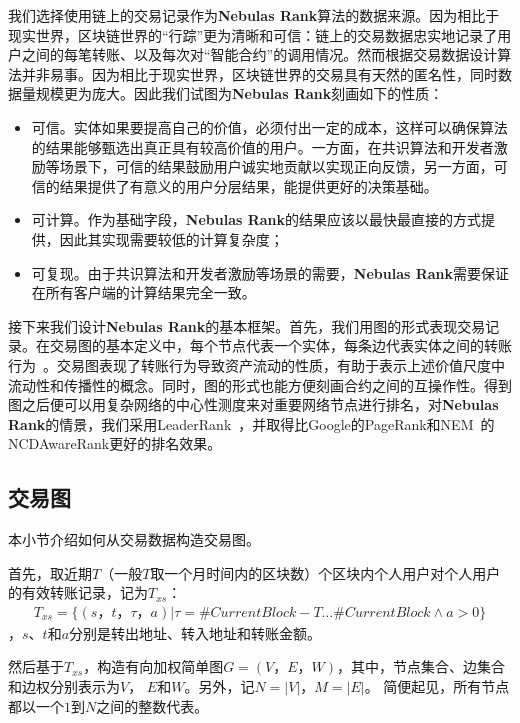 我们选择使用链上的交易记录作为\textbf{Nebulas Rank}算法的数据来源。因为相比于现实世界，区块链世界的“行踪”更为清晰和可信：链上的交易数据忠实地记录了用户之间的每笔转账、以及每次对“智能合约”的调用情况。然而根据交易数据设计算法并非易事。因为相比于现实世界，区块链世界的交易具有天然的匿名性，同时数据量规模更为庞大。因此我们试图为\textbf{Nebulas Rank}刻画如下的性质：
\begin{itemize}
	\item 可信。实体如果要提高自己的价值，必须付出一定的成本，这样可以确保算法的结果能够甄选出真正具有较高价值的用户。一方面，在共识算法和开发者激励等场景下，可信的结果鼓励用户诚实地贡献以实现正向反馈，另一方面，可信的结果提供了有意义的用户分层结果，能提供更好的决策基础。
	\item 可计算。作为基础字段，\textbf{Nebulas Rank}的结果应该以最快最直接的方式提供，因此其实现需要较低的计算复杂度；
	\item 可复现。由于共识算法和开发者激励等场景的需要，\textbf{Nebulas Rank}需要保证在所有客户端的计算结果完全一致。
\end{itemize}

接下来我们设计\textbf{Nebulas Rank}的基本框架。首先，我们用图的形式表现交易记录。在交易图的基本定义中，每个节点代表一个实体，每条边代表实体之间的转账行为~\cite{Tschorsch2015}。交易图表现了转账行为导致资产流动的性质，有助于表示上述价值尺度中流动性和传播性的概念。同时，图的形式也能方便刻画合约之间的互操作性。得到图之后便可以用复杂网络的中心性测度来对重要网络节点进行排名，对\textbf{Nebulas Rank}的情景，我们采用LeaderRank~\cite{Chen2013}\cite{Li2014}，并取得比Google的PageRank和NEM~\cite{nem}的NCDAwareRank更好的排名效果。

\subsection{交易图} \label{subsec:txg}
本小节介绍如何从交易数据构造交易图。

首先，取近期$T$（一般$T$取一个月时间内的区块数）个区块内个人用户对个人用户的有效转账记录，记为$T_{xs}$：
\begin{align}
T_{xs} = \{(s，t，\tau， a)| \tau = \#CurrentBlock-T \dots \#CurrentBlock \land a > 0 \}
\end{align}
，$s$、$t$和$a$分别是转出地址、转入地址和转账金额。

然后基于$T_{xs}$，构造有向加权简单图$G=(V， E， W)$，其中，节点集合、边集合和边权分别表示为$V$， $E$和$W$。另外，记$N = |V|$，$M = |E|$。 简便起见，所有节点都以一个$1$到$N$之间的整数代表。

